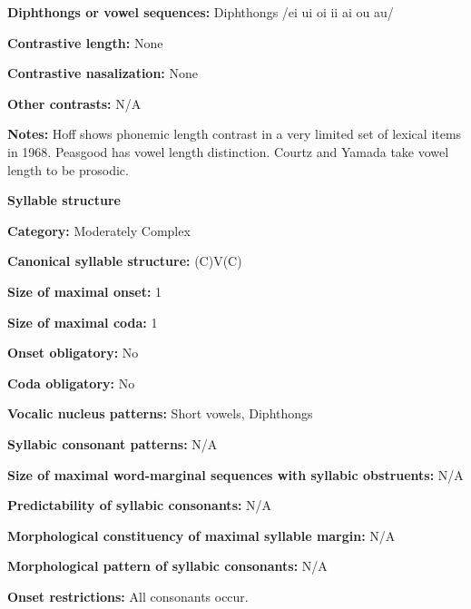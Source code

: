 \textbf{Diphthongs or vowel sequences:} Diphthongs /ei ui oi ii ai ou au/



\textbf{Contrastive length:} None



\textbf{Contrastive nasalization:} None



\textbf{Other contrasts:} N/A



\textbf{Notes:} Hoff shows phonemic length contrast in a very limited set of lexical items in 1968. Peasgood has vowel length distinction. Courtz and Yamada take vowel length to be prosodic.



\textbf{Syllable structure}



\textbf{Category:} Moderately Complex



\textbf{Canonical syllable structure:} (C)V(C) \citep[22-7]{Courtz2008}



\textbf{Size of maximal onset:} 1



\textbf{Size of maximal coda:} 1



\textbf{Onset obligatory:} No



\textbf{Coda obligatory:} No



\textbf{Vocalic nucleus patterns:} Short vowels, Diphthongs



\textbf{Syllabic consonant patterns:} N/A



\textbf{Size of maximal word{}-marginal sequences with syllabic obstruents:} N/A



\textbf{Predictability of syllabic consonants:} N/A



\textbf{Morphological constituency of maximal syllable margin:} N/A



\textbf{Morphological pattern of syllabic consonants:} N/A



\textbf{Onset restrictions:} All consonants occur.



